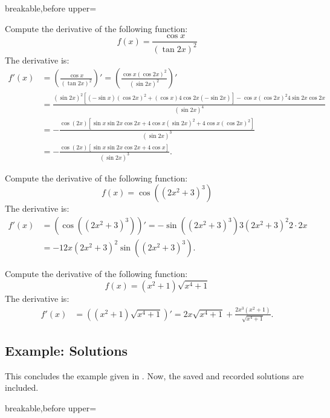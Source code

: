 \begin{dispListing*}{breakable,before upper=}
\begin{exercise}
  Compute the derivative of the following function:
  \begin{equation*}
    f(x)=\frac{\cos x}{(\tan 2x)^2}
  \end{equation*}
\tcblower
  The derivative is:
  \begin{align*}
    f'(x) &= \left( \frac{\cos x}{(\tan 2x)^2} \right)'
    = \left( \frac{\cos x (\cos 2x)^2}{(\sin 2x)^2} \right)'\\
    &= \frac{(\sin 2x)^2 [(-\sin x)(\cos 2x)^2+(\cos x)4\cos 2x (-\sin 2x)]
       - \cos x (\cos 2x)^2 4\sin 2x \cos 2x}{(\sin 2x)^4}\\
    &= -\frac{\cos(2x) [\sin x \sin 2x \cos 2x+ 4\cos x(\sin 2x)^2
       + 4 \cos x (\cos 2x)^2]}{(\sin 2x)^3}\\
    &= -\frac{\cos(2x) [\sin x \sin 2x \cos 2x+ 4\cos x]}{(\sin 2x)^3}.
  \end{align*}
\end{exercise}

\begin{exercise}
  Compute the derivative of the following function:
  \begin{equation*}
    f(x)=\cos((2x^2+3)^3)
  \end{equation*}
\tcblower
  The derivative is:
  \begin{align*}
    f'(x) &= \left( \cos((2x^2+3)^3) \right)'
    =-\sin((2x^2+3)^3) 3(2x^2+3)^2 2\cdot 2x\\
    &=-12x(2x^2+3)^2\sin((2x^2+3)^3).
  \end{align*}
\end{exercise}

\begin{exercise}
  Compute the derivative of the following function:
  \begin{equation*}
    f(x)=(x^2+1)\sqrt{x^4+1}
  \end{equation*}
\tcblower
  The derivative is:
  \begin{align*}
    f'(x) &= \left( (x^2+1)\sqrt{x^4+1} \right)'
    = 2x\sqrt{x^4+1} + \frac{2x^3(x^2+1)}{\sqrt{x^4+1}}.
  \end{align*}
\end{exercise}

\tcbstoprecording
\end{dispListing*}
\tcbusetemp

\subsection{Example: Solutions}\label{sec:recording-solutions}
This concludes the example given in .
Now, the saved and recorded solutions are included.

\begin{dispListing*}{breakable,before upper=}
\tcbinputrecords
\end{dispListing*}
\tcbusetemp
